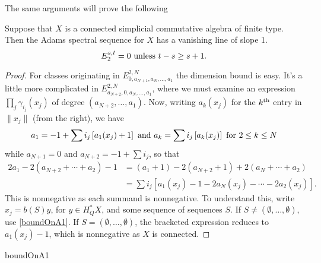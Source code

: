 \documentclass[10pt]{article}
\begin{document}
\begin{VanishingLines}
The same arguments will prove the following
\begin{thm}
Suppose that $X$ is a connected simplicial commutative algebra of finite type. %
Then the Adams spectral sequence for $X$ has a vanishing line of slope 1.
\[E_2^{s,t}=0\textup{\ unless $t-s\geq s+1$.}\]
\end{thm}
\begin{proof}
For classes originating in $E^{2,N}_{0,a_{N+1},a_N,\ldots,a_1}$ the dimension bound is easy. It's a little more complicated in $E^{2,N}_{a_{N+2},0,a_N,\ldots,a_1}$, where we must examine an expression $\prod_j\gamma_{i_j}(x_j)$ of degree $(a_{N+2},\ldots,a_1)$. Now, writing $a_k(x_j)$ for the $k^{\textup{th}}$ entry in $\|x_j\|$ (from the right), we have
\[a_1=-1+\sum i_j\left[a_1(x_j)+1\right]\textup{ and }a_k=\sum i_j\left[a_k(x_j)\right]\textup{ for $2\leq k\leq N$}\]
while $a_{N+1}=0$ and $a_{N+2}=-1+\sum i_j$, so that
\begin{alignat*}{2}
a_{1}-2(a_{N+2}+\cdots +a_2)-1
&=
(a_{1}+1)-2(a_{N+2}+1)+2(a_N+\cdots +a_2)%
\\
&=
\sum i_j\left[a_1(x_j)-1-2a_N(x_j)-\cdots -2a_2(x_j)\right].%
\end{alignat*}
This is nonnegative as each summand is nonnegative. To understand this, write $x_j=b(S)y$, for $y\in H^*_QX$, and some sequence of sequences $S$. If $S\neq(\emptyset,\ldots,\emptyset)$, use \ref{boundOnA1}. If $S=(\emptyset,\ldots,\emptyset)$, the bracketed expression reduces to $a_1(x_j)-1$, which is nonnegative as $X$ is connected.
\end{proof}

\end{VanishingLines}


{boundOnA1}
\end{document}
